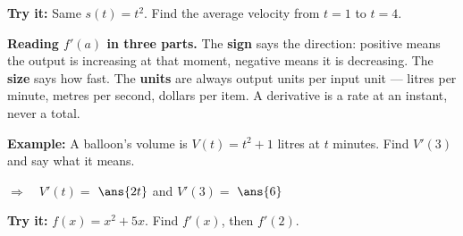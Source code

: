 \documentclass[12pt]{article}
\begin{document}
\begin{tryitbox}
\textbf{Try it:} \quad Same $s(t) = t^2$. Find the average velocity from
$t = 1$ to $t = 4$.\\[2pt]
\end{tryitbox}


\begin{formulabox}
\textbf{Reading $f'(a)$ in three parts.} The \textbf{sign} says the direction:
positive means the output is increasing at that moment, negative means it is
decreasing. The \textbf{size} says how fast. The \textbf{units} are always output
units per input unit --- litres per minute, metres per second, dollars per item.
A derivative is a rate at an instant, never a total.
\end{formulabox}

\begin{examplebox}
\textbf{Example:} \quad A balloon's volume is $V(t) = t^2 + 1$ litres at $t$
minutes. Find $V'(3)$ and say what it means.

$\Rightarrow\quad V'(t) = $ $\ans{2t}$ \quad and \quad $V'(3) = $ $\ans{6}$
\end{examplebox}

\begin{tryitbox}
\textbf{Try it:} \quad $f(x) = x^2 + 5x$. Find $f'(x)$, then $f'(2)$.\\[2pt]
\end{tryitbox}
\end{document}
